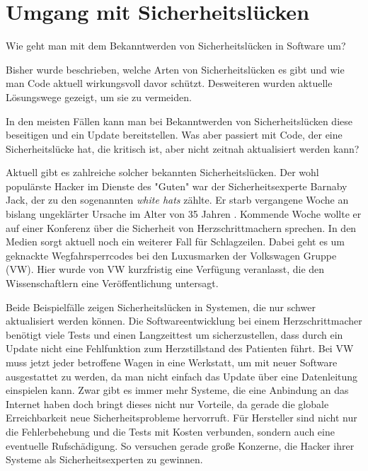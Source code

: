 \section{Umgang mit Sicherheitslücken}
Wie geht man mit dem Bekanntwerden von Sicherheitslücken in Software um?

Bisher wurde beschrieben, welche Arten von Sicherheitslücken es gibt und 
wie man Code aktuell wirkungsvoll davor schützt. Desweiteren wurden aktuelle 
Lösungswege gezeigt, um sie zu vermeiden.

In den meisten Fällen kann man bei Bekanntwerden von Sicherheitslücken
diese beseitigen und ein Update bereitstellen.
Was aber passiert mit Code, der eine Sicherheitslücke hat, die
kritisch ist, aber nicht zeitnah aktualisiert werden kann?

Aktuell gibt es zahlreiche solcher bekannten Sicherheitslücken. Der wohl 
populärste Hacker im Dienste des "Guten" war der Sicherheitsexperte 
Barnaby Jack, der zu den sogenannten \textit{white hats} zählte. Er starb 
vergangene Woche an bislang ungeklärter Ursache im Alter von 35 Jahren
\cite{spon_barnaby_jack}.
Kommende Woche wollte er auf einer Konferenz über die Sicherheit von 
Herzschrittmachern sprechen.
In den Medien sorgt aktuell noch ein weiterer Fall für Schlagzeilen.
Dabei geht es um geknackte Wegfahrsperrcodes \cite{spon_vw} %
bei den Luxusmarken der Volkswagen Gruppe (VW).
Hier wurde von VW kurzfristig eine Verfügung veranlasst, die den Wissenschaftlern
eine Veröffentlichung untersagt.

Beide Beispielfälle zeigen Sicherheitslücken in Systemen, die
nur schwer aktualisiert werden können. 
Die Softwareentwicklung bei einem Herzschrittmacher benötigt viele
Tests und einen Langzeittest um sicherzustellen, dass durch ein Update
nicht eine Fehlfunktion zum Herzstillstand des Patienten führt. 
Bei VW muss jetzt jeder betroffene Wagen in eine Werkstatt, um mit neuer
Software ausgestattet zu werden, da man nicht einfach das Update über 
eine Datenleitung einspielen kann. 
Zwar gibt es immer mehr Systeme, die eine Anbindung an das Internet haben \cite{internet_der_dinge}
doch bringt dieses nicht nur Vorteile, da gerade die globale Erreichbarkeit
neue Sicherheitsprobleme hervorruft.  
Für Hersteller sind nicht nur die Fehlerbehebung und die Tests mit 
Kosten verbunden, sondern auch eine eventuelle Rufschädigung. So versuchen
gerade große Konzerne, die Hacker ihrer Systeme als Sicherheitsexperten 
zu gewinnen.

